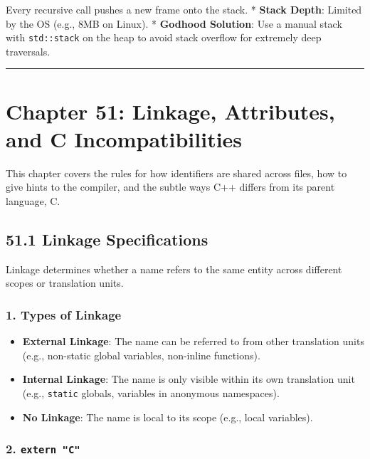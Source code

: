 Every recursive call pushes a new frame onto the stack. * \textbf{Stack
Depth}: Limited by the OS (e.g., 8MB on Linux). * \textbf{Godhood
Solution}: Use a manual stack with \passthrough{\lstinline!std::stack!}
on the heap to avoid stack overflow for extremely deep traversals.

\begin{center}\rule{0.5\linewidth}{0.5pt}\end{center}

\hypertarget{chapter-51-linkage-attributes-and-c-incompatibilities}{%
\section{Chapter 51: Linkage, Attributes, and C
Incompatibilities}\label{chapter-51-linkage-attributes-and-c-incompatibilities}}

This chapter covers the rules for how identifiers are shared across
files, how to give hints to the compiler, and the subtle ways C++
differs from its parent language, C.

\hypertarget{linkage-specifications}{%
\subsection{51.1 Linkage Specifications}\label{linkage-specifications}}

Linkage determines whether a name refers to the same entity across
different scopes or translation units.

\hypertarget{types-of-linkage}{%
\subsubsection{1. Types of Linkage}\label{types-of-linkage}}

\begin{itemize}
\tightlist
\item
  \textbf{External Linkage}: The name can be referred to from other
  translation units (e.g., non-static global variables, non-inline
  functions).
\item
  \textbf{Internal Linkage}: The name is only visible within its own
  translation unit (e.g., \passthrough{\lstinline!static!} globals,
  variables in anonymous namespaces).
\item
  \textbf{No Linkage}: The name is local to its scope (e.g., local
  variables).
\end{itemize}

\hypertarget{extern-c}{%
\subsubsection{\texorpdfstring{2.
\texttt{extern\ "C"}}{2. extern "C"}}\label{extern-c}}

